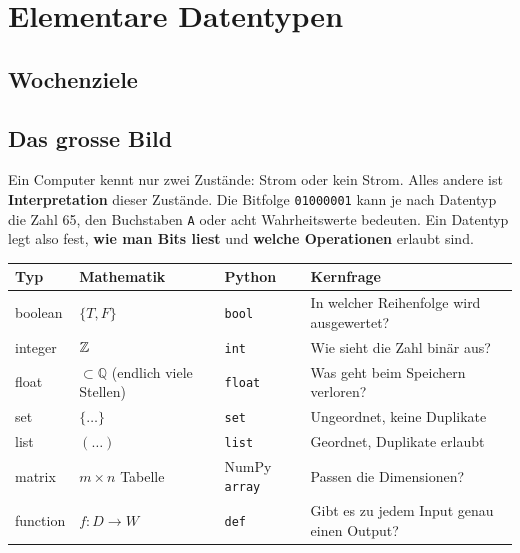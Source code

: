 \chapter{Elementare Datentypen}
\label{kap:01-datentypen}

\section*{Wochenziele}
\begin{wochenziele}
\end{wochenziele}

\section{Das grosse Bild}
Ein Computer kennt nur zwei Zustände: Strom oder kein Strom. Alles andere ist
\textbf{Interpretation} dieser Zustände. Die Bitfolge \texttt{01000001} kann je nach
Datentyp die Zahl 65, den Buchstaben \texttt{A} oder acht Wahrheitswerte bedeuten.
Ein Datentyp legt also fest, \textbf{wie man Bits liest} und \textbf{welche Operationen}
erlaubt sind.

\begin{center}
  \renewcommand{\arraystretch}{1.25}
  \begin{tabularx}{\linewidth}{@{}l l l X@{}}
    \toprule
    Typ & Mathematik & Python & Kernfrage \\
    \midrule
    boolean & $\{T, F\}$ & \texttt{bool} & In welcher Reihenfolge wird ausgewertet? \\
    integer & $\mathbb{Z}$ & \texttt{int} & Wie sieht die Zahl binär aus? \\
    float & $\subset \mathbb{Q}$ (endlich viele Stellen) & \texttt{float} & Was geht beim Speichern verloren? \\
    set & $\{\ldots\}$ & \texttt{set} & Ungeordnet, keine Duplikate \\
    list & $(\ldots)$ & \texttt{list} & Geordnet, Duplikate erlaubt \\
    matrix & $m \times n$ Tabelle & NumPy \texttt{array} & Passen die Dimensionen? \\
    function & $f\colon D \to W$ & \texttt{def} & Gibt es zu jedem Input genau einen Output? \\
    \bottomrule
  \end{tabularx}
\end{center}

